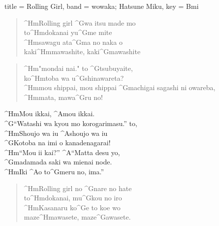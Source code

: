 \begin{song}[
	remember-chords = false ,
	verse/numbered = true ,
	transpose-capo = true 
	]{
		title = Rolling Girl,
		band = wowaka; Hatsune Miku,
		key  = Bmi
	}	
	\begin{verse}
		
		^{Hm}Rolling girl ^{G}wa itsu made mo \\
		to^{Hm}dokanai yu^{G}me mite \\
		^{Hm}sawagu ata^{G}ma no naka o \\ 
		kaki^{Hm}mawashite, kaki^{G}mawashite \\
		
	\end{verse}
	\begin{verse}
		
		^{Hm}"mondai nai." to ^{G}tsubuyaite, \\ 
		ko^{Hm}toba wa u^{G}shinawareta? \\
		^{Hm}mou shippai, mou shippai ^{G}machigai sagashi ni owareba, \\
		^{Hm}mata, mawa^{G}ru no! \\
		
	\end{verse}
	\begin{chorus}
		
		^{Hm}Mou ikkai, ^{A}mou ikkai. \\
		^{G}“Watashi wa kyou mo korogarimasu.” to, \\
		^{Hm}Shoujo wa iu ^{A}shoujo wa iu \\
		^{G}Kotoba na imi o kanadenagarai! \\
		
		^{Hm}“Mou ii kai?” ^{A}“Matta desu yo, \\
		^{G}madamada saki wa mienai node. \\
		^{Hm}Iki ^{A}o to^{G}meru no, ima.” \\
		
	\end{chorus}
	\begin{verse}
		
		^{Hm}Rolling girl no ^{G}nare no hate \\
		to^{Hm}dokanai, mu^{G}kou no iro \\
		^{Hm}Kasanaru ko^{G}e to koe wo  \\
		maze^{Hm}awasete, maze^{G}awasete. \\
		
	\end{verse}
	\begin{verse}
		

\end{verse}
\end{song}
